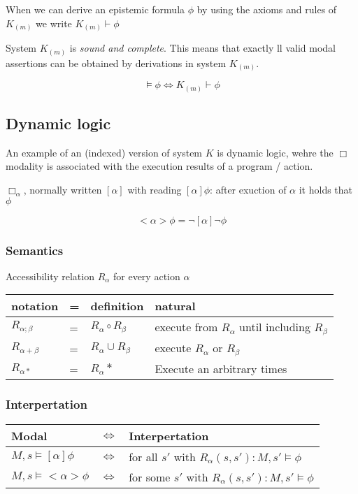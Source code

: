 \documentclass{article}
\begin{document}
When we can derive an epistemic formula $\phi$ by using the axioms
and rules of $K_{(m)}$ we write $K_{(m)} \vdash \phi$

System $K_{(m)}$ is \emph{sound and complete}. This means
that exactly ll valid modal assertions can be obtained by derivations in
system $K_{(m)}$.

\[\vDash \phi \Leftrightarrow K_{(m)} \vdash \phi\]


\subsection{Dynamic logic}
An example of an (indexed) version of system $K$ is dynamic logic,
wehre the $\Box$ modality is associated with the execution results of
a program / action.

$\Box_\alpha$, normally written $[\alpha]$ 
with reading $[\alpha]\phi$: after exuction of $\alpha$ it holds that $\phi$

\[<\alpha>\phi = \neg [\alpha] \neg \phi \]

\subsubsection{Semantics}
Accessibility relation $R_\alpha$ for every action $\alpha$

\begin{tabular}{llll}
	notation & = & definition & natural \\ \toprule
	$R_{\alpha;\beta}$ & = & $R_\alpha \circ R_\beta$ &
	execute from $R_\alpha$ until including $R_\beta$\\
	$R_{\alpha+\beta}$ & = & $R_\alpha \cup R_\beta$ &
	execute $R_\alpha$ or $R_\beta$\\
	$R_{\alpha*}$ & = & $R_\alpha*$ &
	Execute an arbitrary times \\ \bottomrule
\end{tabular}

\subsubsection{Interpertation}
\begin{tabular}{lll}
	Modal & $\Leftrightarrow$ & Interpertation \\ \toprule
	$M,s \vDash [\alpha]\phi$ & $\Leftrightarrow$ &
	for all $s'$ with $R_\alpha(s,s'): M,s' \vDash \phi$ \\
	$M,s \vDash <\alpha>\phi$ & $\Leftrightarrow$ &
	for some $s'$ with $R_\alpha(s,s'): M,s' \vDash \phi$ \\\bottomrule
\end{tabular}
\end{document}

